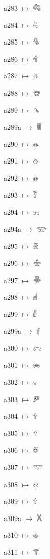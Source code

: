 {\noindent a283 $\mapsto$ {\ahfont 𔔾}\par
\noindent a284 $\mapsto$ {\ahfont 𔔿}\par
\noindent a285 $\mapsto$ {\ahfont 𔕀}\par
\noindent a286 $\mapsto$ {\ahfont 𔕁}\par
\noindent a287 $\mapsto$ {\ahfont 𔕂}\par
\noindent a288 $\mapsto$ {\ahfont 𔕃}\par
\noindent a289 $\mapsto$ {\ahfont 𔕄}\par
\noindent a289a $\mapsto$ {\ahfont 𔕅}\par
\noindent a290 $\mapsto$ {\ahfont 𔕆}\par
\noindent a291 $\mapsto$ {\ahfont 𔕇}\par
\noindent a292 $\mapsto$ {\ahfont 𔕈}\par
\noindent a293 $\mapsto$ {\ahfont 𔕉}\par
\noindent a294 $\mapsto$ {\ahfont 𔕊}\par
\noindent a294a $\mapsto$ {\ahfont 𔕋}\par
\noindent a295 $\mapsto$ {\ahfont 𔕌}\par
\noindent a296 $\mapsto$ {\ahfont 𔕍}\par
\noindent a297 $\mapsto$ {\ahfont 𔕎}\par
\noindent a298 $\mapsto$ {\ahfont 𔕏}\par
\noindent a299 $\mapsto$ {\ahfont 𔕐}\par
\noindent a299a $\mapsto$ {\ahfont 𔕑}\par
\noindent a300 $\mapsto$ {\ahfont 𔕒}\par
\noindent a301 $\mapsto$ {\ahfont 𔕓}\par
\noindent a302 $\mapsto$ {\ahfont 𔕔}\par
\noindent a303 $\mapsto$ {\ahfont 𔕕}\par
\noindent a304 $\mapsto$ {\ahfont 𔕖}\par
\noindent a305 $\mapsto$ {\ahfont 𔕗}\par
\noindent a306 $\mapsto$ {\ahfont 𔕘}\par
\noindent a307 $\mapsto$ {\ahfont 𔕙}\par
\noindent a308 $\mapsto$ {\ahfont 𔕚}\par
\noindent a309 $\mapsto$ {\ahfont 𔕛}\par
\noindent a309a $\mapsto$ {\ahfont 𔕜}\par
\noindent a310 $\mapsto$ {\ahfont 𔕝}\par
\noindent a311 $\mapsto$ {\ahfont 𔕞}\par
}

